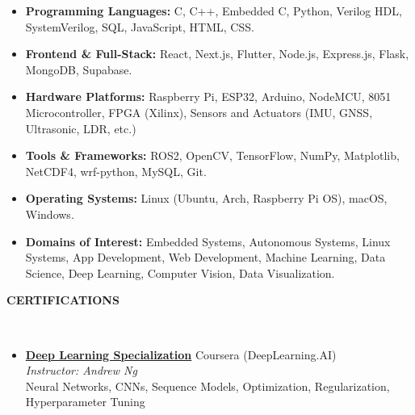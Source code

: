 \documentclass[10pt,a4paper]{article}
\newcommand{\resheading}[1]{{\small \colorbox{mygrey}{\begin{minipage}{0.99\textwidth}{\textbf{#1 \vphantom{p\^{E}}}}\end{minipage}}}}
\begin{document}
\begin{itemize}[noitemsep,nolistsep]

    \item \textbf{Programming Languages:} C, C++, Embedded C, Python, Verilog HDL, SystemVerilog, SQL, JavaScript, HTML, CSS.
    
    \item \textbf{Frontend \& Full-Stack:} React, Next.js, Flutter, Node.js, Express.js, Flask, MongoDB, Supabase.
    
    \item \textbf{Hardware Platforms:} Raspberry Pi, ESP32, Arduino, NodeMCU, 8051 Microcontroller, FPGA (Xilinx), Sensors and Actuators (IMU, GNSS, Ultrasonic, LDR, etc.)
    
    \item \textbf{Tools \& Frameworks:} ROS2, OpenCV, TensorFlow, NumPy, Matplotlib, NetCDF4, wrf-python, MySQL, Git.
    
    \item \textbf{Operating Systems:} Linux (Ubuntu, Arch, Raspberry Pi OS), macOS, Windows.
    
    \item \textbf{Domains of Interest:} Embedded Systems, Autonomous Systems, Linux Systems, App Development, Web Development, Machine Learning, Data Science, Deep Learning, Computer Vision, Data Visualization.

\end{itemize}
\vspace{3pt}
\noindent
\resheading{\textbf{CERTIFICATIONS}}\\[-0.4cm]
\begin{itemize}[noitemsep,nolistsep]

    \item \href{https://coursera.org/share/be953313c178bdf0ee8309b2a82b541a}
    {\textbf{Deep Learning Specialization}} \hfill Coursera (DeepLearning.AI) \\
    \textit{Instructor: Andrew Ng} \\
    Neural Networks, CNNs, Sequence Models, Optimization, Regularization, Hyperparameter Tuning

\end{itemize}
\end{document}
